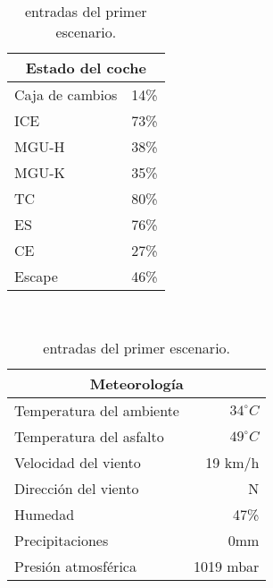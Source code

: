\documentclass[12pt,a4paper,twoside,spanish]{article}      %
\begin{document}
\begin{table}[H]
\begin{tabular}{lr}
        \multicolumn{2}{c}{\textbf{Estado del coche}} \\ \midrule
        Caja de cambios & 14\% \\
        ICE & 73\% \\
        MGU-H & 38\% \\
        MGU-K & 35\% \\
        TC & 80\% \\
        ES & 76\% \\
        CE & 27\% \\
        Escape & 46\% \\ \bottomrule
    \end{tabular} \\ \vspace{1em}
    \begin{tabular}{lr}
        \toprule
        \multicolumn{2}{c}{\textbf{Meteorología}} \\ \midrule
        Temperatura del ambiente & $34^\circ C$ \\
        Temperatura del asfalto & $49^\circ C$ \\
        Velocidad del viento & 19 km/h \\
        Dirección del viento & N \\
        Humedad & 47\% \\
        Precipitaciones & 0mm \\
        Presión atmosférica & 1019 mbar \\ \bottomrule
    \end{tabular} \\ \vspace{1em}
    \caption{entradas del primer escenario.}
    \label{tab:in_esc_1}
\end{table}
\end{document}
